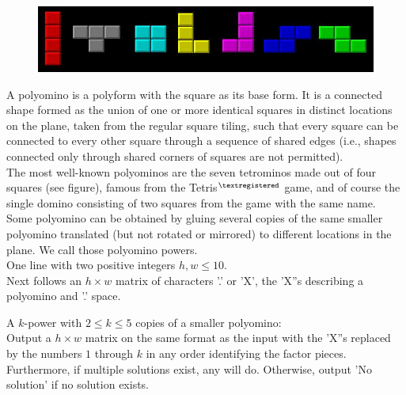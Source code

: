
\begin{figure}
\vspace{-5mm}
\includegraphics[width=\linewidth,keepaspectratio=true]{polyomino/TetrisPieces}
\vspace{-9mm}
\end{figure}

\noindent
A polyomino is a polyform with the square as its base form. It is a
connected shape formed as the union of one or more identical squares in
distinct locations on the plane, taken from the regular square tiling,
such that every square can be connected to every other square through a
sequence of shared edges (i.e., shapes connected only through shared
corners of squares are not permitted). \\
The most well-known polyominos are the seven tetrominos made out of four squares (see figure),
famous from the Tetris$^{\textregistered}$ game, and of course the single domino consisting of two squares
from the game with the same name. Some polyomino can be obtained by
gluing several copies of the same smaller polyomino translated (but not rotated or mirrored) to different locations in the plane.
We call those polyomino powers.\\

\Input
One line with two positive integers $h, w \leq 10$. \\
Next follows an $h \times w$ matrix of characters '.' or 'X', the 'X''s describing a polyomino and '.' space.

\Output
A $k$-power with $2 \leq k \leq 5$ copies of a smaller polyomino: \\
Output a $h\times w$ matrix on the same format as the input with the 'X''s replaced by the numbers $1$ through $k$ in any order identifying the factor pieces. \\
Furthermore, if multiple solutions exist, any will do. Otherwise, output 'No solution' if no solution exists.



